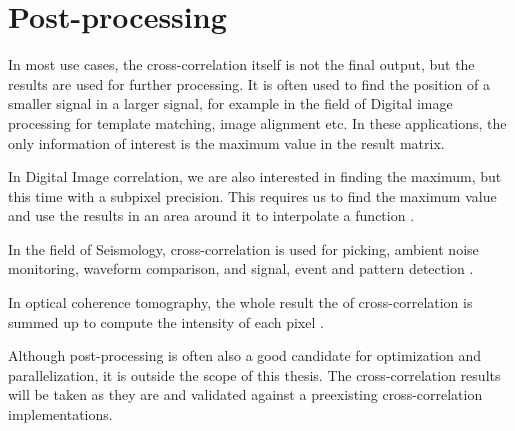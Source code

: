 \section{Post-processing}

In most use cases, the cross-correlation itself is not the final output, but the results are used for further processing. It is often used to find the position of a smaller signal in a larger signal, for example in the field of Digital image processing for template matching, image alignment etc. In these applications, the only information of interest is the maximum value in the result matrix. 

In Digital Image correlation, we are also interested in finding the maximum, but this time with a subpixel precision. This requires us to find the maximum value and use the results in an area around it to interpolate a function \citep{zhang2015} \citep{misko}.

In the field of Seismology, cross-correlation is used for picking, ambient noise monitoring, waveform comparison, and signal, event and pattern detection \citep{Ventosa2019}.
 
In optical coherence tomography, the whole result the of cross-correlation is summed up to compute the intensity of each pixel \citep{Kapinchev2015}. 

Although post-processing is often also a good candidate for optimization and parallelization, it is outside the scope of this thesis. The cross-correlation results will be taken as they are and validated against a preexisting cross-correlation implementations.


